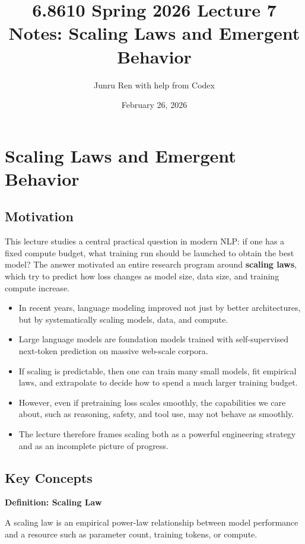 \documentclass[11pt]{article}
\title{6.8610 Spring 2026 Lecture 7 Notes: Scaling Laws and Emergent Behavior}
\author{Junru Ren with help from Codex}
\date{February 26, 2026}
\begin{document}
\maketitle

\section{Scaling Laws and Emergent Behavior}

\subsection{Motivation}
This lecture studies a central practical question in modern NLP: if one has a fixed compute budget, what training run should be launched to obtain the best model? The answer motivated an entire research program around \textbf{scaling laws}, which try to predict how loss changes as model size, data size, and training compute increase.

\begin{itemize}
    \item In recent years, language modeling improved not just by better architectures, but by systematically scaling models, data, and compute.
    \item Large language models are foundation models trained with self-supervised next-token prediction on massive web-scale corpora.
    \item If scaling is predictable, then one can train many small models, fit empirical laws, and extrapolate to decide how to spend a much larger training budget.
    \item However, even if pretraining loss scales smoothly, the capabilities we care about, such as reasoning, safety, and tool use, may not behave as smoothly.
    \item The lecture therefore frames scaling both as a powerful engineering strategy and as an incomplete picture of progress.
\end{itemize}

\subsection{Key Concepts}
\textbf{Definition: Scaling Law}

A scaling law is an empirical power-law relationship between model performance and a resource such as parameter count, training tokens, or compute.
\end{document}

